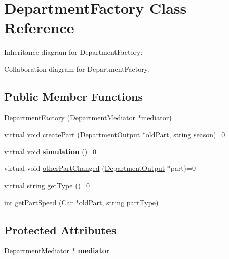 \hypertarget{classDepartmentFactory}{}\section{Department\+Factory Class Reference}
\label{classDepartmentFactory}


Inheritance diagram for Department\+Factory\+:


Collaboration diagram for Department\+Factory\+:
\subsection*{Public Member Functions}
\begin{DoxyCompactItemize}
\item 
\hyperlink{classDepartmentFactory_a94d9bd9fa828f2a04f3b89700007befe}{Department\+Factory} (\hyperlink{classDepartmentMediator}{Department\+Mediator} $\ast$mediator)
\item 
virtual void \hyperlink{classDepartmentFactory_a6080a560efb9fe0b9c870db5a7358886}{create\+Part} (\hyperlink{classDepartmentOutput}{Department\+Output} $\ast$old\+Part, string season)=0
\item 
\mbox{\label{classDepartmentFactory_ad7360e63135822e44031053723ff95fc}} 
virtual void {\bfseries simulation} ()=0
\item 
virtual void \hyperlink{classDepartmentFactory_a41e5c96ee84f8237cb08d31cd782efae}{other\+Part\+Changed} (\hyperlink{classDepartmentOutput}{Department\+Output} $\ast$part)=0
\item 
virtual string \hyperlink{classDepartmentFactory_a5aac775b89c4c390ad885e1de8947b0d}{get\+Type} ()=0
\item 
int \hyperlink{classDepartmentFactory_a9a7fa0ea7860d17be0f3ef095d28a24e}{get\+Part\+Speed} (\hyperlink{classCar}{Car} $\ast$old\+Part, string part\+Type)
\end{DoxyCompactItemize}
\subsection*{Protected Attributes}
\begin{DoxyCompactItemize}
\item 
\mbox{\label{classDepartmentFactory_ae2ecaffebba359878b08a8c2d5a7bc12}} 
\hyperlink{classDepartmentMediator}{Department\+Mediator} $\ast$ {\bfseries mediator}
\end{DoxyCompactItemize}


